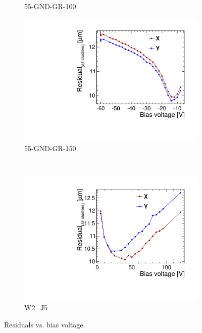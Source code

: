 \begin{figure}[htbp]
\begin{subfigure}[b]{0.33\textwidth}
    \caption{55-GND-GR-100}
  \end{subfigure}\hfill
  \begin{subfigure}[b]{0.33\textwidth}
    \includegraphics[width=\textwidth]{./figures/TestBeam/W5_F1_Residual_vs_bias.pdf}
    \caption{55-GND-GR-150}
  \end{subfigure}\\
  \begin{subfigure}[b]{0.33\textwidth}
    \includegraphics[width=\textwidth]{./figures/TestBeam/W2_J5_Residual_vs_bias.pdf}
    \caption{W2\_J5}
  \end{subfigure}
  \caption{Residuals vs. bias voltage.}
  \label{fig:Residuals_vs_biasVoltage}
\end{figure}







